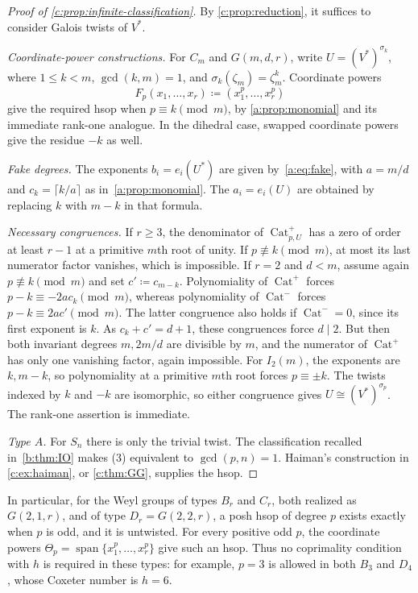 \documentclass[11pt]{amsart}
\newcommand{\defeq}{\coloneqq}
\DeclareMathOperator{\Cat}{Cat}
\theoremstyle{definition}
\begin{document}
\begin{proof}[Proof of \cref{c:prop:infinite-classification}]
By \cref{c:prop:reduction}, it suffices to consider Galois twists of
$V^*$.

\emph{Coordinate-power constructions.}
For $C_m$ and $G(m,d,r)$, write $U=(V^*)^{\sigma_k}$, where
$1\le k<m$, $\gcd(k,m)=1$, and
$\sigma_k(\zeta_m)=\zeta_m^k$. Coordinate powers
\[
 F_p(x_1,\ldots,x_r)\defeq(x_1^p,\ldots,x_r^p)
\]
give the required hsop when $p\equiv k\pmod m$, by
\cref{a:prop:monomial} and its immediate rank-one analogue.
In the dihedral case, swapped coordinate powers give the residue
$-k$ as well.

\emph{Fake degrees.}
The exponents $b_i=e_i(U^*)$ are given by~\cref{a:eq:fake}, with
$a=m/d$ and $c_k=\lceil k/a\rceil$ as in~\cref{a:prop:monomial}.
The $a_i=e_i(U)$ are obtained by replacing $k$ with $m-k$ in that formula.

\emph{Necessary congruences.}
If $r\ge3$, the denominator of $\Cat^+_{p,U}$ has a zero of order at least
$r-1$ at a primitive $m$th root of unity. If $p\not\equiv k\pmod m$,
at most its last numerator factor vanishes, which is impossible.
If $r=2$ and $d<m$, assume again $p\not\equiv k\pmod m$ and set
$c'\defeq c_{m-k}$. Polynomiality of $\Cat^+$ forces
$p-k\equiv-2ac_k\pmod m$, whereas polynomiality of $\Cat^-$ forces
$p-k\equiv2ac'\pmod m$. The latter congruence also holds if $\Cat^-=0$,
since its first exponent is $k$. As $c_k+c'=d+1$, these congruences
force $d\mid2$. But then both invariant degrees $m,2m/d$ are divisible
by $m$, and the numerator of $\Cat^+$ has only one vanishing factor, again
impossible. For $I_2(m)$, the exponents are $k,m-k$, so polynomiality at
a primitive $m$th root forces $p\equiv\pm k$.
The twists indexed by $k$ and $-k$ are isomorphic, so either congruence
gives $U\cong(V^*)^{\sigma_p}$.
The rank-one assertion is immediate.

\emph{Type $A$.}
For $S_n$ there is only the trivial twist. The classification recalled
in~\cref{b:thm:IO} makes (3) equivalent to $\gcd(p,n)=1$.
Haiman's construction
in \cref{c:ex:haiman}, or \cref{c:thm:GG}, supplies the hsop.
\end{proof}

In particular, for the Weyl groups of types $B_r$ and $C_r$, both
realized as $G(2,1,r)$, and of type $D_r=G(2,2,r)$, a posh hsop
of degree $p$ exists exactly when $p$ is odd, and it is untwisted.
For every positive odd $p$, the coordinate powers
$\Theta_p=\operatorname{span}\{x_1^p,\ldots,x_r^p\}$ give such an hsop.
Thus no coprimality condition with $h$ is required in these types:
for example, $p=3$ is allowed in both $B_3$ and $D_4$, whose Coxeter
number is $h=6$.
\end{document}
